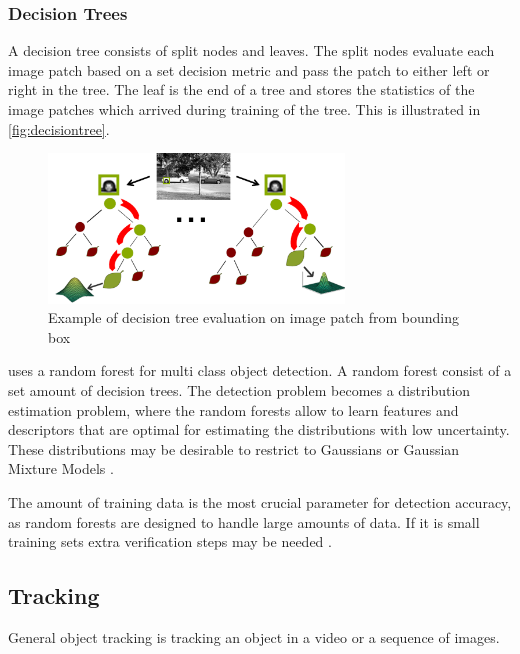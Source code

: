 \subsubsection{Decision Trees}
A decision tree consists of split nodes and leaves. The split nodes evaluate each image patch based on a set decision metric and pass the patch to either left or right in the tree. The leaf is the end of a tree and stores the statistics of the image patches which arrived during training of the tree. This is illustrated in \autoref{fig:decisiontree}.

\begin{figure}[H]
  \centering
  \includegraphics[width=0.7\textwidth]{figures/decisiontree}
  \caption{Example of decision tree evaluation on image patch from bounding box \citep{Gall2012}}
  \label{fig:decisiontree}
\end{figure}

\cite{Gall2012} uses a random forest for multi class object detection. A random forest consist of a set amount of decision trees.
The detection problem becomes a distribution estimation problem, where the random forests allow to learn features and descriptors that are optimal for estimating the distributions with low uncertainty. These distributions may be desirable to restrict to Gaussians or Gaussian Mixture Models \citep{Gall2012}.

The amount of training data is the most crucial parameter for detection accuracy, as random forests are designed to handle large amounts of data. If it is small training sets extra verification steps may be needed \citep{Gall2018}.

\subsection{Tracking}
General object tracking is tracking an object in a video or a sequence of images.
